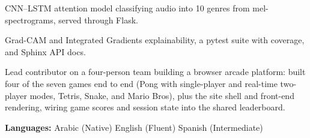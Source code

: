 \documentclass[a4paper,10pt]{article}
\begin{document}
\begin{cvitems}
  \item CNN--LSTM attention model classifying audio into 10 genres from
        mel-spectrograms, served through Flask.
  \item Grad-CAM and Integrated Gradients explainability, a pytest suite with
        coverage, and Sphinx API docs.
\end{cvitems}

\begin{cvitems}
  \item Lead contributor on a four-person team building a browser arcade
        platform: built four of the seven games end to end (Pong with
        single-player and real-time two-player modes, Tetris, Snake, and Mario
        Bros), plus the site shell and front-end rendering, wiring game scores
        and session state into the shared leaderboard.
\end{cvitems}


\vspace{1pt}
\textbf{Languages:} Arabic (Native) \cvsep English (Fluent) \cvsep Spanish (Intermediate)
\end{document}
